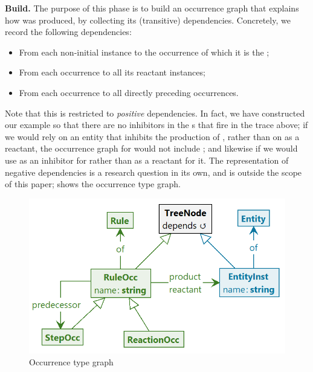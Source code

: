 \medskip\noindent\textbf{Build.}
%
The purpose of this phase is to build an occurrence graph that explains how \Forbidden was produced, by collecting its (transitive) dependencies. Concretely, we record the following dependencies:
\begin{itemize}
\item From each non-initial \Entity instance to the \Rule occurrence of which it is the \product;
\item From each \Rule occurrence to all its reactant \Entity instances;
\item From each \Step occurrence to all directly preceding \Step occurrences.
\end{itemize}
%
Note that this is restricted to \emph{positive} dependencies. In fact, we have constructed our example so that there are no inhibitors in the \Rule{}s that fire in the trace above; if we would rely on an entity \milk that inhibits the production of \espresso, rather than on \nomilk as a reactant, the occurrence graph for \bang would not include \milk; and likewise if we would use \cappuccino as an inhibitor for \anger rather than \espresso as a reactant for it. The representation of negative dependencies is a research question in its own, and is outside the scope of this paper;  shows the occurrence type graph. 

\begin{figure}
\centering
\includegraphics[scale=.2]{figs/occur-type}
\caption{Occurrence type graph}
\label{fig:occur-type}
\end{figure}


